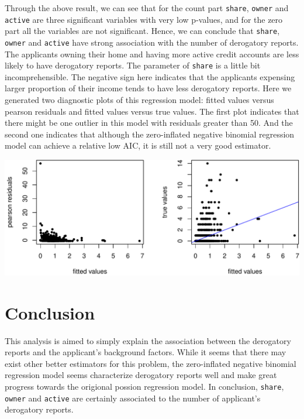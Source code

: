 \documentclass[
]{article}
\begin{document}
Through the above result, we can see that for the count part
\texttt{share}, \texttt{owner} and \texttt{active} are three significant
variables with very low p-values, and for the zero part all the
variables are not significant. Hence, we can conclude that
\texttt{share}, \texttt{owner} and \texttt{active} have strong
association with the number of derogatory reports. The applicants owning
their home and having more active credit accounts are less likely to
have derogatory reports. The parameter of \texttt{share} is a little bit
incomprehensible. The negative sign here indicates that the applicants
expensing larger proportion of their income tends to have less
derogatory reports. Here we generated two diagnostic plots of this
regression model: fitted values versus pearson residuals and fitted
values versus true values. The first plot indicates that there might be
one outlier in this model with residuals greater than 50. And the second
one indicates that although the zero-inflated negative binomial
regression model can achieve a relative low AIC, it is still not a very
good estimator.

\includegraphics{stats504_hw1_files/figure-latex/unnamed-chunk-5-1.pdf}

\hypertarget{conclusion}{%
\section{Conclusion}\label{conclusion}}

This analysis is aimed to simply explain the association between the
derogatory reports and the applicant's background factors. While it
seems that there may exist other better estimators for this problem, the
zero-inflated negative binomial regression model seems characterize
derogatory reports well and make great progress towards the origional
possion regression model. In conclusion, \texttt{share}, \texttt{owner}
and \texttt{active} are certainly associated to the number of
applicant's derogatory reports.
\end{document}
